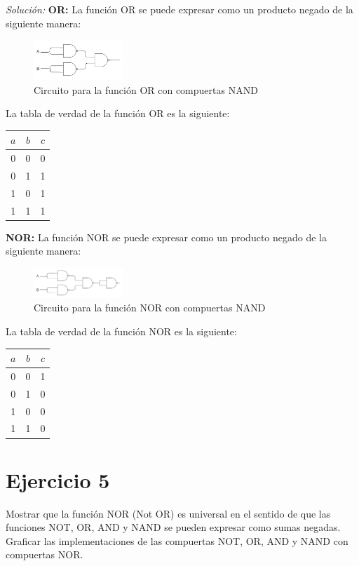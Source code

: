 \documentclass{article}
\newenvironment{solution}
    {\textit{Solución:}}
    {}
\begin{document}
\begin{solution}
\textbf{OR:} La función OR se puede expresar como un producto negado de la siguiente manera:
\begin{figure}[H]
    \centering
    \includegraphics[width=0.3\textwidth]{tp02fig9.png}
    \caption{Circuito para la función OR con compuertas NAND}
\end{figure}
La tabla de verdad de la función OR es la siguiente:
\begin{table}[H]
    \centering
    \begin{tabular}{|c|c|c|}
    \hline
    $a$ & $b$ & $c$ \\ \hline
    0   & 0   & 0   \\ \hline
    0   & 1   & 1   \\ \hline
    1   & 0   & 1   \\ \hline
    1   & 1   & 1   \\ \hline
    \end{tabular}
\end{table}

\textbf{NOR:} La función NOR se puede expresar como un producto negado de la siguiente manera:
\begin{figure}[H]
    \centering
    \includegraphics[width=0.3\textwidth]{tp02fig10.png}
    \caption{Circuito para la función NOR con compuertas NAND}
\end{figure}
La tabla de verdad de la función NOR es la siguiente:
\begin{table}[H]
    \centering
    \begin{tabular}{|c|c|c|}
    \hline
    $a$ & $b$ & $c$ \\ \hline
    0   & 0   & 1   \\ \hline
    0   & 1   & 0   \\ \hline
    1   & 0   & 0   \\ \hline
    1   & 1   & 0   \\ \hline
    \end{tabular}
\end{table}
\end{solution}

\section*{Ejercicio 5}
Mostrar que la función NOR (Not OR) es universal en el sentido de que las funciones NOT, OR, AND y NAND se pueden expresar como sumas negadas. Graficar las implementaciones de las compuertas NOT, OR, AND y NAND con compuertas NOR.
\end{document}
